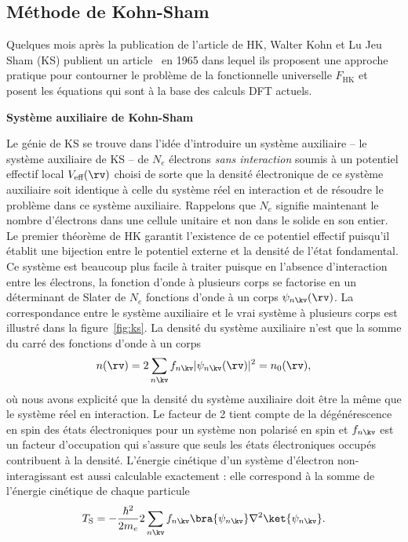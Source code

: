 \subsection{Méthode de Kohn-Sham}\label{sec:2.2.2}

Quelques mois après la publication de l'article de HK, Walter Kohn et Lu Jeu Sham (KS) publient un article~\cite{kohnSelfConsistentEquationsIncluding1965} en 1965 dans lequel ils proposent une approche pratique pour contourner le problème de la fonctionnelle universelle $F_\text{HK}$ et posent les équations qui sont à la base des calculs DFT actuels.

\noindent\textbf{Système auxiliaire de Kohn-Sham}

Le génie de KS se trouve dans l'idée d'introduire un système auxiliaire -- le système auxiliaire de KS -- de $N_e$ électrons \textit{sans interaction} soumis à un potentiel effectif local $V_\text{eff}(\rv)$ choisi de sorte que la densité électronique de ce système auxiliaire soit identique à celle du système réel en interaction et de résoudre le problème dans ce système auxiliaire. Rappelons que $N_e$ signifie maintenant le nombre d'électrons dans une cellule unitaire et non dans le solide en son entier. Le premier théorème de HK  garantit l'existence de ce potentiel effectif puisqu'il établit une bijection entre le potentiel externe et la densité de l'état fondamental. Ce système est beaucoup plus facile à traiter puisque en l'absence d'interaction entre les électrons, la fonction d'onde à plusieurs corps se factorise en un déterminant de Slater de $N_e$ fonctions d'onde à un corps $\psi_{n\kv}(\rv)$. La correspondance entre le système auxiliaire et le vrai système à plusieurs corps est illustré dans la figure~\ref{fig:ks}. La densité du système auxiliaire n'est que la somme du carré des fonctions d'onde à un corps
\begin{equation}
    \label{eqn:c2_nKS}
    n(\rv) = 2\sum_{n\kv} f_{n\kv}|\psi_{n\kv}(\rv)|^2=n_0(\rv),
\end{equation}
où nous avons explicité que la densité du système auxiliaire doit être la même que le système réel en interaction. Le facteur de 2 tient compte de la dégénérescence en spin des états électroniques pour un système non polarisé en spin et $f_{n\kv}$ est un facteur d'occupation qui s'assure que seuls les états électroniques occupés contribuent à la densité. L'énergie cinétique d'un système d'électron non-interagissant est aussi calculable exactement : elle correspond à la somme de l'énergie cinétique de chaque particule 
\begin{equation}
    \label{eqn:c2_TS}
    T_\text{S}=-\frac{\hbar^2}{2m_e}2\sum_{n\kv}f_{n\kv}\bra{\psi_{n\kv}}\nabla^2\ket{\psi_{n\kv}}.
\end{equation}
